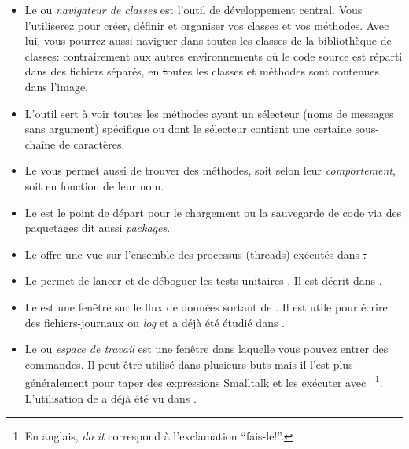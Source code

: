 \documentclass[a4paper,10pt,twoside]{book}
\begin{document}
\begin{itemize}
	\item Le {} ou \emph{navigateur de classes} est l'outil de développement central.
Vous l'utiliserez pour créer, définir et organiser vos classes et vos méthodes. Avec lui, vous pourrez aussi naviguer dans toutes les classes de la bibliothèque de classes: contrairement aux autres environnements où le code source est réparti dans des fichiers séparés, en \st toutes les classes et méthodes sont contenues dans l'image.

	\item L'outil {} sert à voir toutes les méthodes ayant un sélecteur (noms de messages sans argument) spécifique ou dont le sélecteur contient une certaine sous-chaîne de caractères.
	
	\item Le {} vous permet aussi de trouver des méthodes, soit selon leur \emph{comportement}, soit en fonction de leur nom.
	
	\item Le {} est le point de départ pour le chargement ou la sauvegarde de code via des paquetages  dit aussi \emph{packages}.
	
	\item Le { offre une vue sur l'ensemble des processus (threads) exécutés dans \st.}
	
	\item Le {} permet de lancer et de déboguer les tests unitaires \SUnit. Il est décrit dans .
	
	\item Le {} est une fenêtre sur le flux de données sortant de . Il est utile pour écrire des fichiers-journaux ou \emph{log} et a déjà été étudié dans .
	
	\item Le {} ou \emph{espace de travail} est une fenêtre dans laquelle vous pouvez entrer des commandes.  
	Il peut être utilisé dans plusieurs buts mais il l'est plus généralement pour taper des expressions Smalltalk et les exécuter avec 
~\footnote{En anglais, \emph{do it} correspond à l'exclamation ``fais-le!''.}. L'utilisation de  a déjà été vu dans .
\end{itemize}
\end{document}
